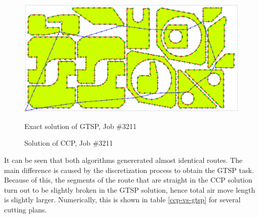\documentclass[]{interact}
\theoremstyle{plain}%
\theoremstyle{definition}
\theoremstyle{remark}
\begin{document}
\begin{figure}
  \begin{center}
  \resizebox*{0.95\textwidth}{!}
  {\includegraphics{3211-gtsp.png}}
  \end{center}
  \caption{Exact solution of GTSP, Job \#3211}
  \label{gtsp-path}
\end{figure}

\begin{figure}
  \begin{center}
  \end{center}
  \caption{Solution of CCP, Job \#3211}
  \label{ccp-path}
\end{figure}

It can be seen that both algorithms
genererated almost identical routes.
The main difference is caused by the discretization process
to obtain the GTSP task.
Because of this,
the segments of the route that are straight in the CCP solution
turn out to be slightly broken in the GTSP solution,
hence total air move length is slightly larger.
Numerically, this is shown in table \ref{ccp-vs-gtsp}
for several cutting plans.
\end{document}
